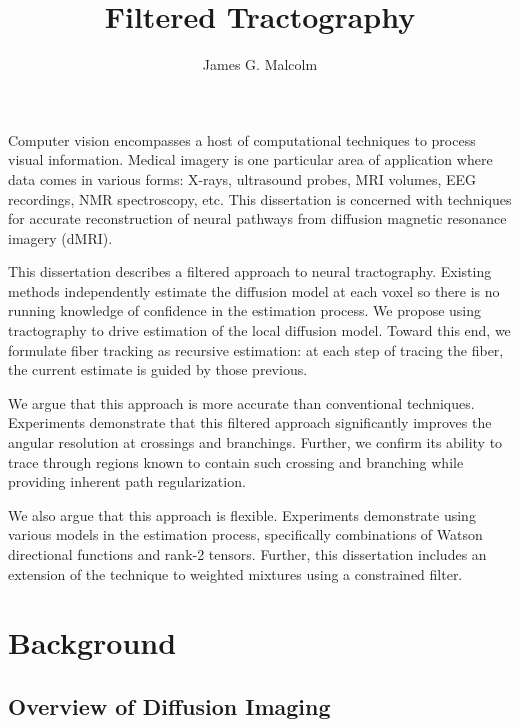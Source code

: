 \documentclass[final,hyperref]{gatech-thesis}
\title{Filtered Tractography}
\author{James G. Malcolm}
\begin{document}

\begin{preliminary}
\contents


\begin{summary}
  Computer vision encompasses a host of computational techniques to process
  visual information.
  Medical imagery is one particular area of application where data comes in
  various forms: X-rays, ultrasound probes, MRI volumes, EEG recordings, NMR
  spectroscopy, etc.
  This dissertation is concerned with techniques for accurate reconstruction
  of neural pathways from diffusion magnetic resonance imagery (dMRI).

  This dissertation describes a filtered approach to neural tractography.
  Existing methods independently estimate the diffusion model at each voxel so
  there is no running knowledge of confidence in the estimation process.
  We propose using tractography to drive estimation of the local diffusion
  model.
  Toward this end, we formulate fiber tracking as recursive estimation: at
  each step of tracing the fiber, the current estimate is guided by those
  previous.

  We argue that this approach is more accurate than conventional techniques.
  Experiments demonstrate that this filtered approach significantly improves
  the angular resolution at crossings and branchings.  Further, we confirm its
  ability to trace through regions known to contain such crossing and
  branching while providing inherent path regularization.

  We also argue that this approach is flexible.  Experiments demonstrate using
  various models in the estimation process, specifically combinations of
  Watson directional functions and rank-2 tensors.  Further, this dissertation
  includes an extension of the technique to weighted mixtures using a
  constrained filter.
\end{summary}

\end{preliminary}

\chapter{Background}

\section{Overview of Diffusion Imaging}
\end{document}
